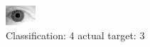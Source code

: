 \begin{figure}[h!]
\begin{center}
\includegraphics[width=0.60\columnwidth]{figures/ID2152_class_4_target_3.png}
\end{center}
\caption{ Classification: 4 actual target: 3}
\label{fig:ID2152_class_4_target_3}
\end{figure}
